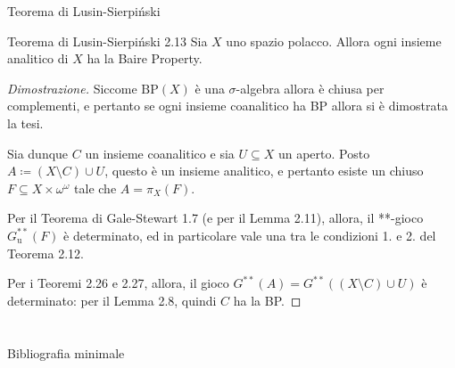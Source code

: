 \documentclass[babel]{beamer}
\renewcommand{\href}[2]{#2}
\begin{document}
\begin{frame}[label={sec:org1ea7ae6}]{Teorema di Lusin-Sierpiński}
\begin{alertblock}{Teorema di Lusin-Sierpiński 2.13}
Sia \(X\) uno \href{../../../../../../../org/roam/20250301194013-spazio_polacco.org}{spazio polacco}. Allora ogni \href{../../../../../../../org/roam/20250525220742-insieme_analitico.org}{insieme analitico} di \(X\) ha la \href{../../../../../../../org/roam/20250514154039-proprieta_di_baire.org}{Baire Property}.
\end{alertblock}
\begin{proof}[Dimostrazione]
Siccome \(\mathrm{BP}(X)\) è una \href{../../../../../../../org/roam/20250526100313-sigma_algebra.org}{\(\sigma\)-algebra} allora è chiusa per complementi, e pertanto se ogni insieme coanalitico ha BP allora si è dimostrata la tesi.

Sia dunque \(C\) un insieme coanalitico e sia \(U \subseteq X\) un aperto. Posto \(A\coloneqq (X\setminus C)\cup U\), questo è un insieme analitico, e pertanto  esiste un chiuso \(F \subseteq X\times\omega^{\omega}\) tale che \(A=\pi_{X}(F)\).

Per il \href{../../../../../../../org/roam/20250514144736-teorema_di_gale_stewart.org}{Teorema di Gale-Stewart} 1.7 (e per il Lemma 2.11), allora, il \href{../../../../../../../org/roam/20250513111844-gioco_di_banach_mazur.org}{**-gioco \(G^{ * *}_{\text{u}}(F)\)} è \href{../../../../../../../org/roam/20250513155732-logic_game.org}{determinato}, ed in particolare vale una tra le condizioni 1. e 2. del Teorema 2.12.

Per i \href{../../../../../../../org/roam/20250514174717-teorema_di_caratterizzazione_dei_comagri_tramite_il_gioco_di_banach_mazur.org}{Teoremi} 2.26 e 2.27, allora, il \href{../../../../../../../org/roam/20250513111844-gioco_di_banach_mazur.org}{gioco \(G^{**}(A) = G^{ * *}\left((X\setminus C) \cup U\right)\)} è determinato: per il Lemma 2.8, quindi \(C\) ha la BP.
\end{proof}
\end{frame}
\section{\null}
\label{sec:orgb9588db}

\begin{frame}[label={sec:orgdd9b26a}]{Bibliografia minimale}
\nocite{*}
\printbibliography
\end{frame}
\end{document}
